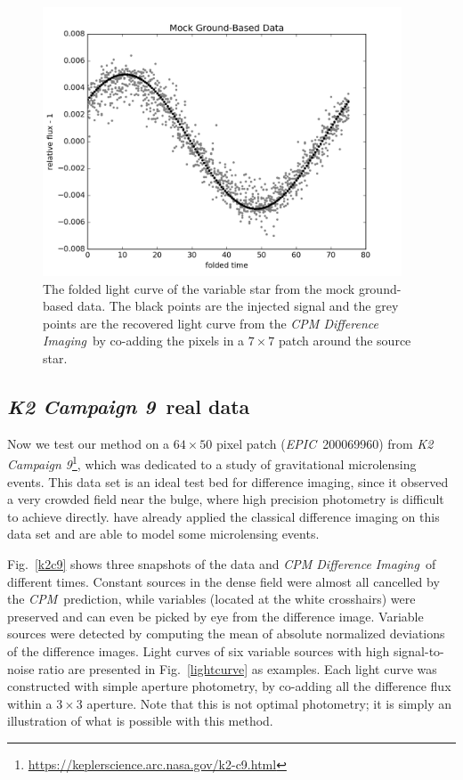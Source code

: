 \documentclass[12pt, preprint]{aastex}
\newcommand{\project}[1]{\textsl{#1}}
\newcommand{\cpm}{\project{CPM}}
\newcommand{\cpmdiff}{\project{CPM Difference Imaging}}
\newcommand{\KTCN}{\project{K2 Campaign 9}}
\newcommand{\epic}{\project{EPIC}}
\begin{document}
\begin{figure}[p]
\begin{center}
\includegraphics[width=0.95\textwidth]{f4a}
\end{center}
\caption{
\label{ground_lc}
 The folded light curve of the variable star from the mock ground-based data.
 The black points are the injected signal and the grey points are the recovered light curve from the \cpmdiff\ by co-adding the pixels in a $7\times 7$ patch around the source star.
}
\end{figure}

\subsection{\KTCN\ real data}
Now we test our method on a $64\times50$ pixel patch (\epic\ 200069960) from \KTCN\footnote{\url{https://keplerscience.arc.nasa.gov/k2-c9.html}}\citep{k2c9}, which was dedicated to a study of gravitational microlensing events.
This data set is an ideal test bed for difference imaging, since it observed a very crowded field near the bulge, where high precision photometry is difficult to achieve directly.
\cite{wei} have already applied the classical difference imaging on this data set and are able to model some microlensing events.

Fig.~\ref{k2c9} shows three snapshots of the data and \cpmdiff\ of different times.
Constant sources in the dense field were almost all cancelled by the \cpm\ prediction, while variables (located at the white crosshairs) were preserved and can even be picked by eye from the difference image.
Variable sources were detected by computing the mean of absolute normalized deviations of the difference images. 
Light curves of six variable sources with high signal-to-noise ratio are presented in Fig.~\ref{lightcurve} as examples. 
Each light curve was constructed with simple aperture photometry, by co-adding all the difference flux within a $3 \times 3$ aperture. 
Note that this is not optimal photometry; it is simply an illustration of what is possible with this method.
\end{document}
